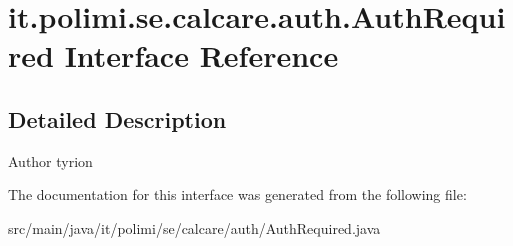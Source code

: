\hypertarget{interfaceit_1_1polimi_1_1se_1_1calcare_1_1auth_1_1AuthRequired}{}\section{it.\+polimi.\+se.\+calcare.\+auth.\+Auth\+Required Interface Reference}
\label{interfaceit_1_1polimi_1_1se_1_1calcare_1_1auth_1_1AuthRequired}


\subsection{Detailed Description}
\begin{DoxyAuthor}{Author}
tyrion 
\end{DoxyAuthor}


The documentation for this interface was generated from the following file\+:\begin{DoxyCompactItemize}
\item 
src/main/java/it/polimi/se/calcare/auth/Auth\+Required.\+java\end{DoxyCompactItemize}
